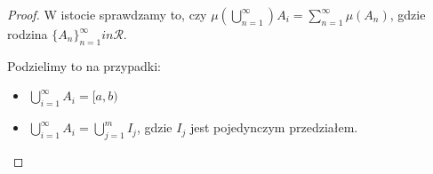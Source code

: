 \begin{proof}
	
	W istocie sprawdzamy to, czy $\mu\left( \bigcup_{n=1}^{\infty} \right) A_{i} = \sum_{n=1}^{\infty} \mu\left( A_{n} \right)$, gdzie rodzina $\{A_{n}\}_{n=1}^{\infty} in \mathcal{R}$.

Podzielimy to na przypadki:
\begin{itemize}
	\item $\bigcup_{i=1}^{\infty}A_{i} = [a,b)$
	\item $\bigcup_{i=1}^{\infty}A_{i} = \bigcup_{j=1}^{m}I_{j} $, gdzie $I_{j}$ jest pojedynczym przedziałem.
\end{itemize}
\end{proof} 

